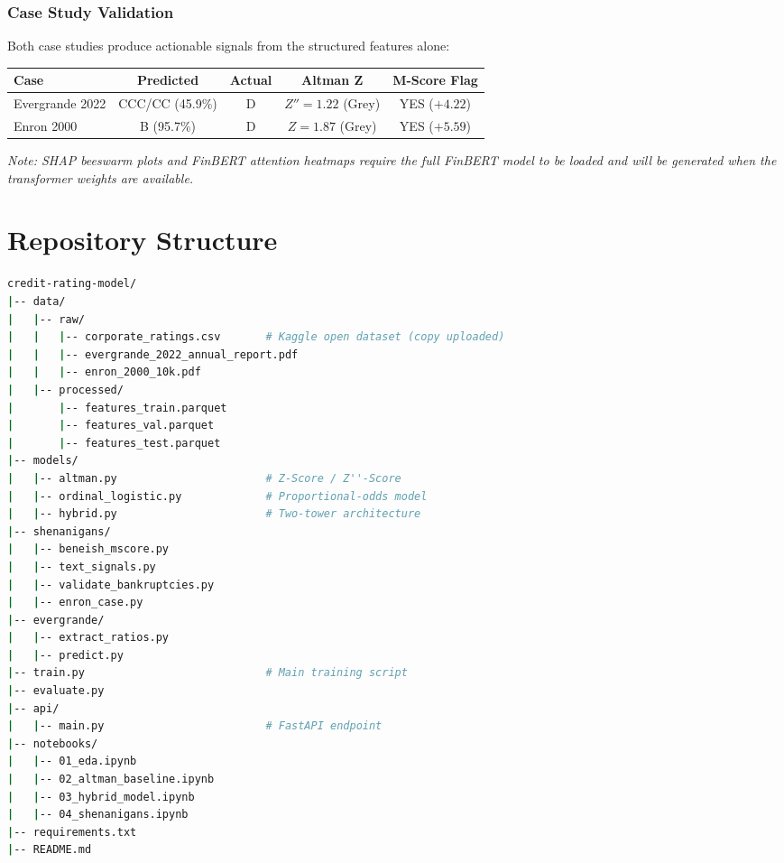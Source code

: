 \documentclass[12pt, a4paper]{article}
\begin{document}
\subsubsection{Case Study Validation}

Both case studies produce actionable signals from the structured features alone:

\begin{center}
\begin{tabular}{l c c c c}
  \toprule
  \textbf{Case} & \textbf{Predicted} & \textbf{Actual} & \textbf{Altman Z} & \textbf{M-Score Flag} \\
  \midrule
  Evergrande 2022 & CCC/CC (45.9\%) & D & $Z'' = 1.22$ (Grey) & \textcolor{dangerred}{YES} ($+4.22$) \\
  Enron 2000      & B (95.7\%)       & D & $Z = 1.87$ (Grey)   & \textcolor{dangerred}{YES} ($+5.59$) \\
  \bottomrule
\end{tabular}
\end{center}

\noindent\textit{Note: SHAP beeswarm plots and FinBERT attention heatmaps require the full FinBERT model to be loaded and will be generated when the transformer weights are available.}

\newpage

\section{Repository Structure}
\label{sec:repo}

\begin{lstlisting}[language=bash, caption={Repository layout}]
credit-rating-model/
|-- data/
|   |-- raw/
|   |   |-- corporate_ratings.csv       # Kaggle open dataset (copy uploaded)
|   |   |-- evergrande_2022_annual_report.pdf
|   |   |-- enron_2000_10k.pdf
|   |-- processed/
|       |-- features_train.parquet
|       |-- features_val.parquet
|       |-- features_test.parquet
|-- models/
|   |-- altman.py                       # Z-Score / Z''-Score
|   |-- ordinal_logistic.py             # Proportional-odds model
|   |-- hybrid.py                       # Two-tower architecture
|-- shenanigans/
|   |-- beneish_mscore.py
|   |-- text_signals.py
|   |-- validate_bankruptcies.py
|   |-- enron_case.py
|-- evergrande/
|   |-- extract_ratios.py
|   |-- predict.py
|-- train.py                            # Main training script
|-- evaluate.py
|-- api/
|   |-- main.py                         # FastAPI endpoint
|-- notebooks/
|   |-- 01_eda.ipynb
|   |-- 02_altman_baseline.ipynb
|   |-- 03_hybrid_model.ipynb
|   |-- 04_shenanigans.ipynb
|-- requirements.txt
|-- README.md
\end{lstlisting}
\end{document}

